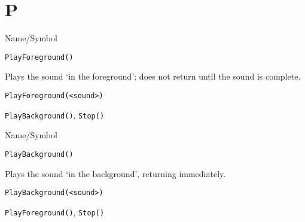 \rl
\section{P}
\rl


\begin{desc}{Name/Symbol}
\item[Name/Symbol]	\verb+PlayForeground()+  

\item[Description]	Plays the sound `in the foreground'; 
		does not return until the sound is complete.

\item[Usage]		
\begin{verbatim}
PlayForeground(<sound>)
\end{verbatim}

\item[Example]	

\item[See Also]	\verb+PlayBackground()+, \verb+Stop()+
\end{desc}

\rl


\begin{desc}{Name/Symbol}
\item[Name/Symbol]	\verb+PlayBackground()+
 
\item[Description]	Plays the sound `in the background', returning immediately.

\item[Usage]		
\begin{verbatim}
PlayBackground(<sound>)
\end{verbatim}

\item[Example]	

\item[See Also]	\verb+PlayForeground()+, \verb+Stop()+
\end{desc}

\rl



